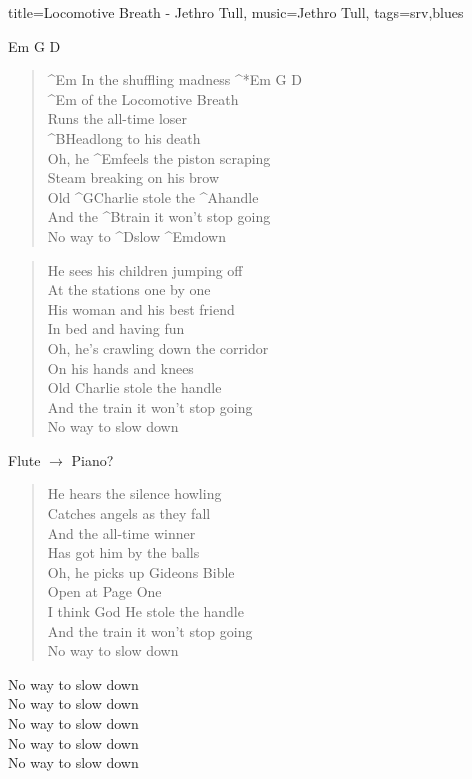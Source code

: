 \begin{song}{
		title={Locomotive Breath - Jethro Tull}, 
		music={Jethro Tull}, tags={srv,blues}}
\begin{intro}
	{Em} {G} D
\end{intro}
\begin{verse}
	^{Em} In the shuffling madness ^*{Em G D} \\
	^{Em} of the Locomotive Breath \\
	Runs the all-time loser \\
	^{B}Headlong to his death \\
	Oh, he ^{Em}feels the piston scraping \\
	Steam breaking on his brow \\
	Old ^{G}Charlie stole the ^{A}handle \\
	And the ^{B}train it won't stop going \\
	No way to ^{D}slow ^{Em}down
\end{verse}

\begin{verse}
	He sees his children jumping off \\
	At the stations one by one
\\
	His woman and his best friend \\
	In bed and having fun
\\
	Oh, he's crawling down the corridor \\
	On his hands and knees
\\
	Old Charlie stole the handle \\
	And the train it won't stop going \\
	No way to slow down
\end{verse}

\begin{solo}
	Flute $\rightarrow$ Piano?
\end{solo}

\begin{verse}
	He hears the silence howling
\\
	Catches angels as they fall
\\
	And the all-time winner
\\
	Has got him by the balls
\\
	Oh, he picks up Gideons Bible \\
	Open at Page One
\\
	I think God He stole the handle \\
	And the train it won't stop going
\\
	No way to slow down
\end{verse}

\begin{outro}
	No way to slow down
\\
	No way to slow down
\\
	No way to slow down
\\
	No way to slow down
\\
	No way to slow down
\end{outro}

\end{song}